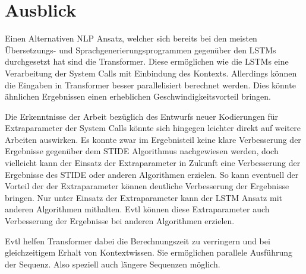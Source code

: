 \section{Ausblick}
Einen Alternativen \ac{NLP} Ansatz, welcher sich bereits bei den meisten Übersetzungs-  und Sprachgenerierungsprogrammen  gegenüber den \acp{LSTM} durchgesetzt hat sind die Transformer.
Diese ermöglichen wie die \acp{LSTM} eine Verarbeitung der System Calls mit Einbindung des Kontexts.
Allerdings können die Eingaben in Transformer besser parallelisiert berechnet werden.
Dies könnte ähnlichen Ergebnissen einen erheblichen Geschwindigkeitsvorteil bringen.

Die Erkenntnisse der Arbeit bezüglich des Entwurfs neuer Kodierungen für Extraparameter der System Calls könnte sich hingegen leichter direkt auf weitere Arbeiten auswirken.
Es konnte zwar im Ergebnisteil keine klare Verbesserung der Ergebnisse gegenüber dem \ac{STIDE} Algorithmus nachgewiesen werden, doch vielleicht kann der Einsatz der Extraparameter in Zukunft eine Verbesserung der Ergebnisse des \ac{STIDE} oder anderen Algorithmen erzielen.
So kann eventuell der Vorteil der der Extraparameter können deutliche Verbesserung der Ergebnisse bringen.
Nur unter Einsatz der Extraparameter kann der \ac{LSTM} Ansatz mit anderen Algorithmen mithalten.
Evtl können diese Extraparameter auch Verbesserung der Ergebnisse bei anderen Algorithmen erzielen.

Evtl helfen Transformer dabei die Berechnungszeit zu verringern und bei gleichzeitigem Erhalt von Kontextwissen.
Sie ermöglichen parallele Ausführung der Sequenz.
Also speziell auch längere Sequenzen möglich.
